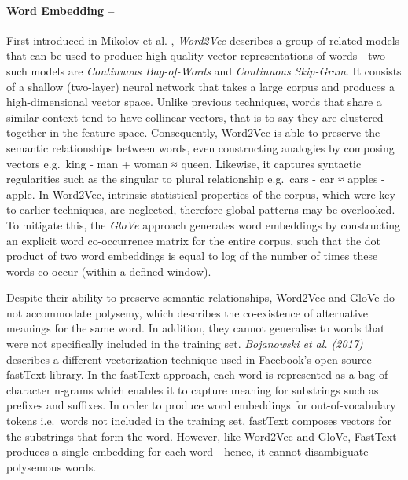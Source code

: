 \documentclass[12pt,a4paper]{article}
\begin{document}
\paragraph{Word Embedding --}
\noindent First introduced in Mikolov et al. \cite{mikolov2013efficient}, \textit{Word2Vec} describes a group of related models that can be used to produce high-quality vector representations of words - two such models are \textit{Continuous Bag-of-Words} and \textit{Continuous Skip-Gram}. It consists of a shallow (two-layer) neural network that takes a large corpus and produces a high-dimensional vector space. Unlike previous techniques, words that share a similar context tend to have collinear vectors, that is to say they are clustered together in the feature space. Consequently, Word2Vec is able to preserve the semantic relationships between words, even constructing analogies by composing vectors e.g.\ king - man + woman ≈ queen. Likewise, it captures syntactic regularities such as the singular to plural relationship e.g.\ cars - car ≈ apples - apple. In Word2Vec, intrinsic statistical properties of the corpus, which were key to earlier techniques, are neglected, therefore global patterns may be overlooked. To mitigate this, the \textit{GloVe} \cite{pennington2014glove} approach generates word embeddings by constructing an explicit word co-occurrence matrix for the entire corpus, such that the dot product of two word embeddings is equal to log of the number of times these words co-occur (within a defined window).

Despite their ability to preserve semantic relationships, Word2Vec and GloVe do not accommodate polysemy, which describes the co-existence of alternative meanings for the same word. In addition, they cannot generalise to words that were not specifically included in the training set. \textit{Bojanowski et al. (2017)} \cite{bojanowski2016enriching} describes a different vectorization technique used in Facebook's open-source fastText library. In the fastText approach, each word is represented as a bag of character n-grams which enables it to capture meaning for substrings such as prefixes and suffixes. In order to produce word embeddings for out-of-vocabulary tokens i.e.\ words not included in the training set, fastText composes vectors for the substrings that form the word. However, like Word2Vec and GloVe, FastText produces a single embedding for each word - hence, it cannot disambiguate polysemous words.
\end{document}
